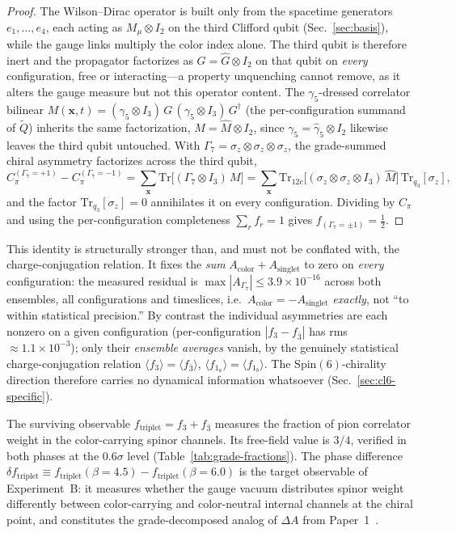 \documentclass[12pt]{article}
\theoremstyle{definition}
\theoremstyle{remark}
\newcommand{\spin}{\mathrm{Spin}}       %
\newcommand{\tr}{\mathrm{Tr}}           %
\newcommand{\half}{\tfrac{1}{2}}
\newcommand{\GaSeven}{\Gamma_7}                      %
\newcommand{\Qtil}{\widetilde{Q}}                    %
\newcommand{\ftriplet}{f_{\mathrm{triplet}}}          %
\newcommand{\dftriplet}{\delta f_{\mathrm{triplet}}}  %
\begin{document}
	\begin{proof}
		The Wilson--Dirac operator is built only from the spacetime generators
		$e_1,\ldots,e_4$, each acting as $M_\mu\otimes I_2$ on the third Clifford
		qubit (Sec.~\ref{sec:basis}), while the gauge links multiply the color
		index alone.  The third qubit is therefore inert and the propagator
		factorizes as $G = \widehat{G}\otimes I_2$ on that qubit on \emph{every}
		configuration, free or interacting---a property unquenching cannot remove,
		as it alters the gauge measure but not this operator content.  The
		$\gamma_5$-dressed correlator bilinear $M(\mathbf{x},t) =
		(\gamma_5\otimes I_3)\,G\,(\gamma_5\otimes I_3)\,G^\dagger$ (the
		per-configuration summand of $\Qtil$) inherits the same factorization,
		$M = \widehat{M}\otimes I_2$, since $\gamma_5 = \widehat{\gamma}_5\otimes
		I_2$ likewise leaves the third qubit untouched.  With $\GaSeven =
		\sigma_z\otimes\sigma_z\otimes\sigma_z$, the grade-summed chiral asymmetry
		factorizes across the third qubit,
		\[
		C_\pi^{(\GaSeven=+1)} - C_\pi^{(\GaSeven=-1)}
		= \sum_{\mathbf{x}} \tr\!\bigl[(\GaSeven\otimes I_3)\,M\bigr]
		= \sum_{\mathbf{x}}
		\tr_{12c}\!\bigl[(\sigma_z\otimes\sigma_z\otimes I_3)\,\widehat{M}\bigr]\,
		\tr_{q_3}[\sigma_z] ,
		\]
		and the factor $\tr_{q_3}[\sigma_z]=0$ annihilates it on every
		configuration.  Dividing by $C_\pi$ and using the per-configuration
		completeness $\sum_r f_r = 1$ gives $f_{(\GaSeven=\pm1)} = \half$.
	\end{proof}
	
	This identity is structurally stronger than, and must not be conflated with,
	the charge-conjugation relation.  It fixes the \emph{sum} $A_{\mathrm{color}}
	+ A_{\mathrm{singlet}}$ to zero on \emph{every} configuration: the measured
	residual is $\max|A_{\GaSeven}| \le 3.9\times10^{-16}$ across both ensembles,
	all configurations and timeslices, i.e.\ $A_{\mathrm{color}} =
	-A_{\mathrm{singlet}}$ \emph{exactly}, not ``to within statistical
	precision.''  By contrast the individual asymmetries are each nonzero on a
	given configuration (per-configuration $|f_3 - f_{\bar 3}|$ has rms
	$\approx 1.1\times10^{-3}$); only their \emph{ensemble averages} vanish, by
	the genuinely statistical charge-conjugation relation $\langle f_3\rangle =
	\langle f_{\bar 3}\rangle$, $\langle f_{1_a}\rangle = \langle f_{1_b}\rangle$.
	The $\spin(6)$-chirality direction therefore carries no dynamical information
	whatsoever (Sec.~\ref{sec:cl6-specific}).
	
	The surviving observable $\ftriplet = f_3 + f_{\bar{3}}$ measures the fraction
	of pion correlator weight in the color-carrying spinor channels.  Its
	free-field value is $3/4$, verified in both phases at the $0.6\sigma$ level
	(Table~\ref{tab:grade-fractions}).  The phase difference
	$\dftriplet \equiv \ftriplet(\beta{=}4.5) - \ftriplet(\beta{=}6.0)$ is the
	target observable of Experiment~B: it measures whether the gauge vacuum
	distributes spinor weight differently between color-carrying and color-neutral
	internal channels at the chiral point, and constitutes the grade-decomposed
	analog of $\Delta A$ from Paper~1~\cite{FirestoneP1}.
	
\end{document}
